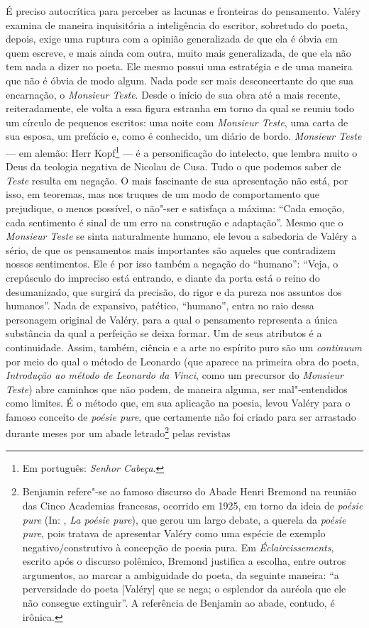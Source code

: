 É preciso autocrítica para perceber as lacunas e fronteiras do
pensamento. Valéry examina de maneira inquisitória a inteligência do
escritor, sobretudo do poeta, depois, exige uma ruptura com a opinião
generalizada de que ela é óbvia em quem escreve, e mais ainda com outra,
muito mais generalizada, de que ela não tem nada a dizer no poeta. Ele
mesmo possui uma estratégia e de uma maneira que não é óbvia de modo algum. Nada pode
ser mais desconcertante do que sua encarnação, o \emph{Monsieur Teste}.
Desde o início de sua obra até a mais recente, reiteradamente, ele volta
a essa figura estranha em torno da qual se reuniu todo um círculo de
pequenos escritos: uma noite com \emph{Monsieur Teste}, uma carta de sua
esposa, um prefácio e, como é conhecido, um diário de bordo. \emph{Monsieur
Teste} --- em alemão: Herr Kopf\footnote{Em português: \emph{Senhor
  Cabeça}. \versal{[N.~T.]}} --- é a personificação do intelecto, que lembra muito o Deus
da teologia negativa de Nicolau de Cusa. Tudo o que podemos
saber de \emph{Teste} resulta em negação. O mais fascinante de sua
apresentação não está, por isso, em teoremas, mas nos truques de um modo
de comportamento que prejudique, o menos possível, o não"-ser e satisfaça
a máxima: ``Cada emoção, cada sentimento é sinal de um erro na construção
e adaptação''. Mesmo que o \emph{Monsieur Teste} se sinta naturalmente humano,
ele levou a sabedoria de Valéry a sério, de que os pensamentos mais
importantes são aqueles que contradizem nossos sentimentos. Ele é por
isso também a negação do ``humano'': ``Veja, o crepúsculo do impreciso está
entrando, e diante da porta está o reino do desumanizado, que surgirá
da precisão, do rigor e da pureza nos assuntos dos humanos''. Nada de
expansivo, patético, ``humano'', entra no raio dessa personagem original
de Valéry, para a qual o pensamento representa a única substância da
qual a perfeição se deixa formar. Um de seus atributos é a continuidade.
Assim, também, ciência e a arte no espírito puro são um \emph{continuum}
por meio do qual o método de Leonardo (que aparece na primeira obra do
poeta, \emph{Introdução ao método de Leonardo da Vinci}, como um precursor do
\emph{Monsieur Teste}) abre caminhos que não podem, de maneira alguma, ser mal"-entendidos como limites. É o método que, em sua aplicação na poesia,
levou Valéry para o famoso conceito de \emph{poésie pure}, que
certamente não foi criado para ser arrastado durante meses por um abade
letrado\footnote{Benjamin refere"-se ao famoso discurso do Abade
  Henri Bremond na reunião das Cinco Academias francesas, ocorrido em
  1925, em torno da ideia de \emph{poésie pure} (In: , \emph{La
  poésie pure}), que gerou um largo debate, a querela da \emph{poésie
    pure}, pois tratava de apresentar Valéry como uma espécie de exemplo
  negativo/construtivo à concepção de poesia pura. Em
  \emph{Éclaircissements}, escrito após o discurso polêmico, Bremond
  justifica a escolha, entre outros argumentos, ao marcar a ambiguidade
  do poeta, da seguinte maneira: ``a perversidade do poeta {[}Valéry{]}
  que se nega; o esplendor da auréola que ele não consegue extinguir''.
  A referência de Benjamin ao abade, contudo, é irônica. \versal{[N.~O.]}} pelas revistas
